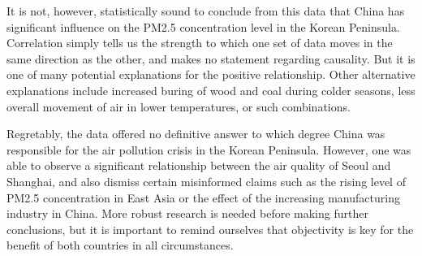 \documentclass[11pt]{article}
\begin{document}
It is not, however, statistically sound to conclude from this data that
China has significant influence on the PM2.5 concentration level in the
Korean Peninsula. Correlation simply tells us the strength to which one
set of data moves in the same direction as the other, and makes no
statement regarding causality. But it is one of many potential
explanations for the positive relationship. Other alternative
explanations include increased buring of wood and coal during colder
seasons, less overall movement of air in lower temperatures, or such
combinations.

Regretably, the data offered no definitive answer to which degree China
was responsible for the air pollution crisis in the Korean Peninsula.
However, one was able to observe a significant relationship between the
air quality of Seoul and Shanghai, and also dismiss certain misinformed
claims such as the rising level of PM2.5 concentration in East Asia or
the effect of the increasing manufacturing industry in China. More
robust research is needed before making further conclusions, but it is
important to remind ourselves that objectivity is key for the benefit of
both countries in all circumstances.


    
    
    
    
\end{document}
